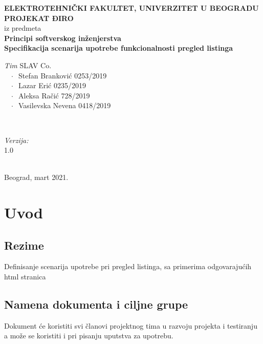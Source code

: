 \documentclass[12pt]{article}
\begin{document}
    \renewcommand{\labelenumii}{\arabic{enumi}.\arabic{enumii}}
	\begin{titlepage}  
		\center
		\textbf{ \LARGE ELEKTROTEHNIČKI FAKULTET, UNIVERZITET U BEOGRADU } \\[4cm]
		\textbf{ \Large PROJEKAT ĐIRO\texttrademark} \\[0.3cm]
		iz predmeta \\[0.3cm]
		\textbf{ \Large Principi softverskog inženjerstva} \\[0.7cm]
		{ \huge \bfseries Specifikacija scenarija upotrebe funkcionalnosti pregled listinga } \\[6cm]
		

		\begin{minipage}{0.5\textwidth}
			\begin{flushleft}
				\large
				\emph{Tim} SLAV Co. \\
			     $\;\;\; \cdot \;\;$Stefan Branković  0253/2019\\
			     $\;\;\; \cdot \;\;$Lazar Erić 0235/2019\\
			     $\;\;\; \cdot \;\;$Aleksa Račić 728/2019\\
			     $\;\;\; \cdot \;\;$Vasilevska Nevena 0418/2019
			\end{flushleft}
		\end{minipage}
		~
		\begin{minipage}{0.4\textwidth}
			\begin{flushright}
				\large
				\emph{Verzija:} \\
				1.0
			\end{flushright}
		\end{minipage} \\[2cm]
		\enlargethispage{4\baselineskip}
		{ \large Beograd, mart 2021. }
		\vfill
	\end{titlepage}
\pagebreak
\tableofcontents
\pagebreak



\section{Uvod}
\subsection{Rezime}
Definisanje scenarija upotrebe pri pregled listinga, sa primerima odgovarajućih html stranica
\subsection{Namena dokumenta i ciljne grupe}
Dokument će koristiti svi članovi projektnog tima u razvoju projekta i testiranju a može se koristiti i pri pisanju uputstva za
upotrebu.
\end{document}

